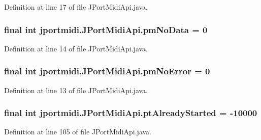 Definition at line 17 of file J\+Port\+Midi\+Api.\+java.

\subsubsection[{\texorpdfstring{pm\+No\+Data}{pmNoData}}]{\setlength{\rightskip}{0pt plus 5cm}final {\bf int} jportmidi.\+J\+Port\+Midi\+Api.\+pm\+No\+Data = 0}\hypertarget{classjportmidi_1_1_j_port_midi_api_ac72682822346615e5b82cd193b32a9dc}{}\label{classjportmidi_1_1_j_port_midi_api_ac72682822346615e5b82cd193b32a9dc}


Definition at line 14 of file J\+Port\+Midi\+Api.\+java.

\subsubsection[{\texorpdfstring{pm\+No\+Error}{pmNoError}}]{\setlength{\rightskip}{0pt plus 5cm}final {\bf int} jportmidi.\+J\+Port\+Midi\+Api.\+pm\+No\+Error = 0}\hypertarget{classjportmidi_1_1_j_port_midi_api_a88fe1e18da9d46fffeeff5abe19a07a0}{}\label{classjportmidi_1_1_j_port_midi_api_a88fe1e18da9d46fffeeff5abe19a07a0}


Definition at line 13 of file J\+Port\+Midi\+Api.\+java.

\subsubsection[{\texorpdfstring{pt\+Already\+Started}{ptAlreadyStarted}}]{\setlength{\rightskip}{0pt plus 5cm}final {\bf int} jportmidi.\+J\+Port\+Midi\+Api.\+pt\+Already\+Started = -\/10000}\hypertarget{classjportmidi_1_1_j_port_midi_api_abe56cd27ee679025e93ad1c3d94d937f}{}\label{classjportmidi_1_1_j_port_midi_api_abe56cd27ee679025e93ad1c3d94d937f}


Definition at line 105 of file J\+Port\+Midi\+Api.\+java.

